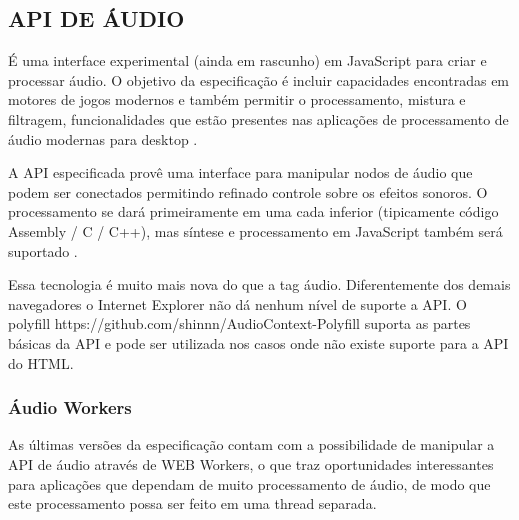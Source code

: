 \subsection{API DE ÁUDIO}
\begin{draft}

É uma interface experimental (ainda em rascunho) em JavaScript para
criar e processar áudio. O objetivo da especificação é incluir
capacidades encontradas em motores de jogos modernos e também permitir
o processamento, mistura e filtragem, funcionalidades que estão
presentes nas aplicações de processamento de áudio modernas para
desktop \autocite{audioApiSpec}.

A API especificada provê uma interface para manipular nodos de
áudio que podem ser conectados permitindo refinado controle sobre os
efeitos sonoros. O processamento se dará primeiramente em uma cada
inferior (tipicamente código Assembly / C / C++), mas síntese e
processamento em JavaScript também será suportado \autocite{audioApiSpec}.

Essa tecnologia é muito mais nova do que a tag áudio. Diferentemente
dos demais navegadores o Internet Explorer não dá nenhum nível de
suporte a API. O polyfill https://github.com/shinnn/AudioContext-Polyfill
suporta as partes básicas da API e pode ser utilizada nos casos onde 
não existe suporte para a API do HTML.

\subsubsection{Áudio Workers}

As últimas versões da especificação contam com a possibilidade
de manipular a API de áudio através de WEB Workers, o que traz
oportunidades interessantes para aplicações que dependam de muito
processamento de áudio, de modo que este processamento possa ser feito
em uma thread separada.

\end{draft}
